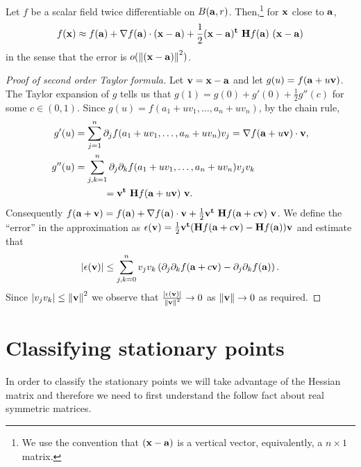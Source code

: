 \begin{theorem}
    Let \(f\) be a scalar field twice differentiable on \(B(\aa,r)\).
    Then,\footnote{We use the convention that \((\xx-\aa)\) is a vertical vector, equivalently, a \(n \times 1\) matrix.} for \(\xx\) close to \(\aa\),
    \[
        f(\xx) \approx f(\aa) + \nabla f(\aa) \cdot (\xx-\aa) + \frac{1}{2} (\xx-\aa)^{\mathbf{t}} \ \mathbf{H} f (\aa) \ (\xx-\aa)
    \]
    in the sense that the error is \(\littleo{\norm{(\xx-\aa)}^2}\).
\end{theorem}

\begin{proof}[Proof of second order Taylor formula]
    Let \(\vv = \xx-\aa\) and let \(g(u) = f(\aa + u \vv)\).
    The Taylor expansion of \(g\) tells us that
    \(g(1) = g(0) + g'(0) + \frac{1}{2} g''(c)\) for some \(c\in (0,1)\).
    Since \(g(u) = f(a_1 + uv_1, \ldots, a_n + u v_n)\), by the chain rule,
    \[
        \begin{aligned}
            g'(u)  & = \sum_{j=1}^{n} \partial_j f( a_1 + uv_1, \ldots, a_n + u v_n ) v_j
            =\nabla f( \aa + u \vv) \cdot \vv,                                                            \\
            g''(u) & = \sum_{j,k=1}^{n} \partial_j\partial_k f( a_1 + uv_1, \ldots, a_n + u v_n ) v_j v_k \\
                   & \quad \quad \quad
            =  \vv^{\mathbf{t}} \ \mathbf{H} f (\aa + u \vv) \ \vv.
        \end{aligned}
    \]
    Consequently
    \(
    f(\aa+\vv) = f(\aa) + \nabla f(\aa) \cdot \vv + \frac{1}{2} \vv^{\mathbf{t}} \ \mathbf{H} f (\aa + c\vv) \ \vv
    \).
    We define the ``error'' in the approximation as \(\epsilon(\vv) = \frac{1}{2}  \vv^{\mathbf{t}} (\mathbf{H} f (\aa + c\vv) - \mathbf{H} f (\aa)  ) \vv\)
    and estimate that
    \[
        \abs{\epsilon(\vv)} \leq \sum_{j,k=0}^{n}
        v_j v_k \left( \partial_{j}\partial_{k}f(\aa+c\vv)-\partial_{j}\partial_{k}f(\aa) \right).
    \]
    Since \(\abs{ v_j v_k} \leq \norm{\vv}^2\) we observe that \(\frac{\abs{\epsilon(\vv)} }{\norm{\vv}^2} \to 0\) as \(\norm{\vv} \to 0\) as required.
\end{proof}


\section{Classifying stationary points}

In order to classify the stationary points we will take advantage of the Hessian matrix and therefore we need to first understand the follow fact about real symmetric matrices.

